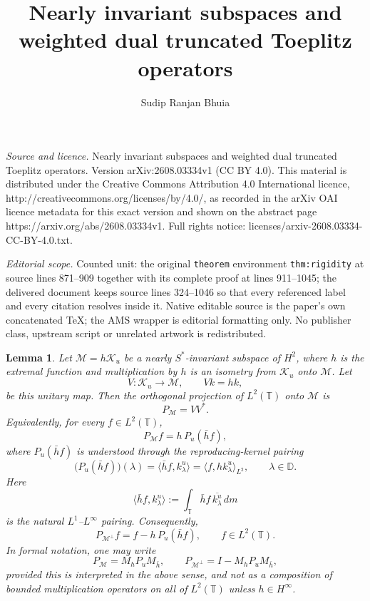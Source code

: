\documentclass[10pt,a4paper]{amsart}
\newtheorem{lemma}[theorem]{Lemma}
\def \D{\mathbb{D}}
\def \T{\mathbb{T}}
\newcommand{\clm}{\mathcal{M}}
\newcommand{\clk}{\mathcal{K}}
\numberwithin{equation}{section}
\begin{document}
\title[Nearly invariant subspaces and weighted dual truncated Toepl]{Nearly invariant subspaces and weighted dual truncated Toeplitz operators}
\author{Sudip Ranjan Bhuia}
\date{}
\maketitle
\noindent\emph{Source and licence.} Nearly invariant subspaces and weighted dual truncated Toeplitz operators. Version arXiv:2608.03334v1 (CC BY 4.0). This material is distributed under the Creative Commons Attribution 4.0 International licence, http://creativecommons.org/licenses/by/4.0/, as recorded in the arXiv OAI licence metadata for this exact version and shown on the abstract page https://arxiv.org/abs/2608.03334v1. Full rights notice: licenses/arxiv-2608.03334-CC-BY-4.0.txt.\par\smallskip
\noindent\textit{Editorial scope.} Counted unit: the original \texttt{theorem} environment \texttt{thm:rigidity} at source lines 871--909 together with its complete proof at lines 911--1045; the delivered document keeps source lines 324--1046 so that every referenced label and every citation resolves inside it. Native editable source is the paper's own concatenated TeX; the AMS wrapper is editorial formatting only. No publisher class, upstream script or unrelated artwork is redistributed.
\begin{lemma}\label{lem:proj}
Let $\clm=h\clk_u$ be a nearly $S^*$-invariant subspace of $H^2$, where $h$ is the extremal function and multiplication by $h$ is an isometry from $\clk_u$ onto $\clm$. Let
\[
V:\clk_u\to \clm,\qquad Vk=hk ,
\]
be this unitary map. Then the orthogonal projection of $L^2(\T)$ onto $\clm$ is
\[
P_\clm=VV^*.
\]
Equivalently, for every $f\in L^2(\T)$,
\[
P_\clm f=h\,P_u(\bar h f),
\]
where $P_u(\bar h f)$ is understood through the reproducing-kernel pairing
\[
\big(P_u(\bar h f)\big)(\lambda)
=
\langle \bar h f,k_\lambda^u\rangle
=
\langle f,hk_\lambda^u\rangle_{L^2},
\qquad \lambda\in\D.
\]
Here
\[
\langle \bar h f,k_\lambda^u\rangle
:=
\int_\T \bar h f\,\overline{k_\lambda^u}\,dm
\]
is the natural $L^1$--$L^\infty$ pairing. Consequently,
\[
P_{\clm^\perp}f=f-h\,P_u(\bar h f), \qquad f\in L^2(\T).
\]
In formal notation, one may write
\[
P_\clm=M_hP_uM_{\bar h}, \qquad  P_{\clm^\perp}=I-M_hP_uM_{\bar h},
\]
provided this is interpreted in the above sense, and not as a composition of bounded multiplication operators on all of $L^2(\T)$ unless $h\in H^\infty$.
\end{lemma}
\end{document}
